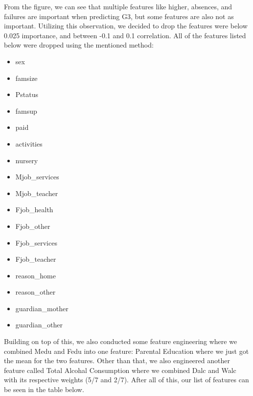 \documentclass[11pt,a4paper]{article}
\begin{document}
From the figure, we can see that multiple features like higher, absences, and failures are important when predicting G3, but some features are also not as important. Utilizing this observation, we decided to drop the features were below 0.025 importance, and between -0.1 and 0.1 correlation. All of the features listed below were dropped using the mentioned method:
\begin{itemize}
    \item sex
    \item famsize
    \item Pstatus
    \item famsup
    \item paid
    \item activities
    \item nursery
    \item Mjob\_services
    \item Mjob\_teacher
    \item Fjob\_health
    \item Fjob\_other
    \item Fjob\_services
    \item Fjob\_teacher
    \item reason\_home
    \item reason\_other
    \item guardian\_mother
    \item guardian\_other
\end{itemize}

Building on top of this, we also conducted some feature engineering where we combined Medu and Fedu into one feature: Parental Education where we just got the mean for the two features. Other than that, we also engineered another feature called Total Alcohal Consumption where we combined Dalc and Walc with its respective weights (5/7 and 2/7). After all of this, our list of features can be seen in the table below.
\end{document}
